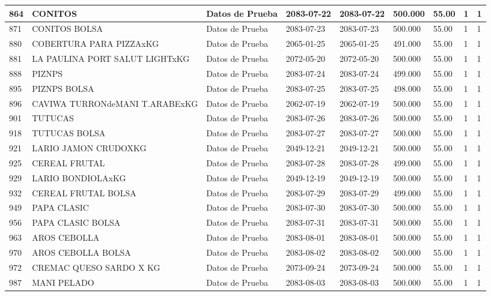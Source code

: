 \documentclass[a4paper,12pt]{article}
\begin{document}
\begin{landscape}
\begin{longtable}{|p{4cm}|p{2.5cm}|p{2.5cm}|p{1.8cm}|p{1.8cm}|p{1cm}|p{1cm}|p{3cm}|p{3cm}||}
864 & CONITOS & Datos de Prueba & 2083-07-22 & 2083-07-22 & 500.000 & 55.00 & 1 & 1 \\ \hline 
871 & CONITOS BOLSA & Datos de Prueba & 2083-07-23 & 2083-07-23 & 500.000 & 55.00 & 1 & 1 \\ \hline 
880 & COBERTURA PARA PIZZAxKG & Datos de Prueba & 2065-01-25 & 2065-01-25 & 491.000 & 55.00 & 1 & 1 \\ \hline 
881 & LA PAULINA PORT SALUT LIGHTxKG & Datos de Prueba & 2072-05-20 & 2072-05-20 & 500.000 & 55.00 & 1 & 1 \\ \hline 
888 & PIZNPS & Datos de Prueba & 2083-07-24 & 2083-07-24 & 499.000 & 55.00 & 1 & 1 \\ \hline 
895 & PIZNPS BOLSA & Datos de Prueba & 2083-07-25 & 2083-07-25 & 498.000 & 55.00 & 1 & 1 \\ \hline 
896 & CAVIWA TURRONdeMANI T.ARABExKG & Datos de Prueba & 2062-07-19 & 2062-07-19 & 500.000 & 55.00 & 1 & 1 \\ \hline 
901 & TUTUCAS & Datos de Prueba & 2083-07-26 & 2083-07-26 & 500.000 & 55.00 & 1 & 1 \\ \hline 
918 & TUTUCAS BOLSA & Datos de Prueba & 2083-07-27 & 2083-07-27 & 500.000 & 55.00 & 1 & 1 \\ \hline 
921 & LARIO JAMON CRUDOXKG & Datos de Prueba & 2049-12-21 & 2049-12-21 & 500.000 & 55.00 & 1 & 1 \\ \hline 
925 & CEREAL FRUTAL & Datos de Prueba & 2083-07-28 & 2083-07-28 & 499.000 & 55.00 & 1 & 1 \\ \hline 
929 & LARIO BONDIOLAxKG & Datos de Prueba & 2049-12-19 & 2049-12-19 & 500.000 & 55.00 & 1 & 1 \\ \hline 
932 & CEREAL FRUTAL BOLSA & Datos de Prueba & 2083-07-29 & 2083-07-29 & 499.000 & 55.00 & 1 & 1 \\ \hline 
949 & PAPA CLASIC & Datos de Prueba & 2083-07-30 & 2083-07-30 & 500.000 & 55.00 & 1 & 1 \\ \hline 
956 & PAPA CLASIC BOLSA & Datos de Prueba & 2083-07-31 & 2083-07-31 & 500.000 & 55.00 & 1 & 1 \\ \hline 
963 & AROS CEBOLLA & Datos de Prueba & 2083-08-01 & 2083-08-01 & 500.000 & 55.00 & 1 & 1 \\ \hline 
970 & AROS CEBOLLA BOLSA & Datos de Prueba & 2083-08-02 & 2083-08-02 & 500.000 & 55.00 & 1 & 1 \\ \hline 
972 & CREMAC QUESO SARDO X KG & Datos de Prueba & 2073-09-24 & 2073-09-24 & 500.000 & 55.00 & 1 & 1 \\ \hline 
987 & MANI PELADO & Datos de Prueba & 2083-08-03 & 2083-08-03 & 500.000 & 55.00 & 1 & 1 \\ \hline 

\end{longtable}
\end{landscape}
\end{document}
